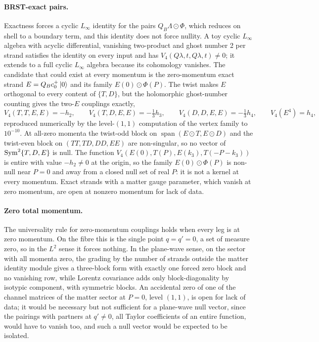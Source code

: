 \paragraph{BRST-exact pairs.}
Exactness forces a cyclic $L_\infty$ identity for the pairs $Q_B \Lambda \odot \Phi$, which reduces on shell to a boundary term, and this identity does not force nullity.
A toy cyclic $L_\infty$ algebra with acyclic differential, vanishing two-product and ghost number 2 per strand satisfies the identity on every input and has $V_4(Q \lambda, t, Q \lambda, t) \ne 0$; it extends to a full cyclic $L_\infty$ algebra because its cohomology vanishes.
The candidate that could exist at every momentum is the zero-momentum exact strand $E = Q_B c_0^+ \ket{0}$ and its family $E(0) \odot \Phi(P)$.
The twist makes $E$ orthogonal to every content of $\{T, D\}$, but the holomorphic ghost-number counting gives the two-$E$ couplings exactly,
\begin{equation}
  \label{eq:mom:two-E}
  V_4(T, T, E, E)
    = - h_2,
  \qquad
  V_4(T, D, E, E)
    = - \tfrac{1}{3} h_3,
  \qquad
  V_4(D, D, E, E)
    = - \tfrac{1}{3} h_4,
  \qquad
  V_4(E^4)
    = h_4,
\end{equation}
reproduced numerically by the level-$(1, 1)$ computation of the vertex family to $10^{-10}$.
At all-zero momenta the twist-odd block on $\operatorname{span}(E \odot T, E \odot D)$ and the twist-even block on $(TT, TD, DD, EE)$ are non-singular, so no vector of $\operatorname{Sym}^2 \{T, D, E\}$ is null.
The function $V_4(E(0), T(P), E(k_3), T(- P - k_3))$ is entire with value $- h_2 \ne 0$ at the origin, so the family $E(0) \odot \Phi(P)$ is non-null near $P = 0$ and away from a closed null set of real $P$: it is not a kernel at every momentum.
Exact strands with a matter gauge parameter, which vanish at zero momentum, are open at nonzero momentum for lack of data.

\paragraph{Zero total momentum.}
The universality rule for zero-momentum couplings holds when every leg is at zero momentum.
On the fibre this is the single point $q = q' = 0$, a set of measure zero, so in the $L^2$ sense it forces nothing.
In the plane-wave sense, on the sector with all momenta zero, the grading by the number of strands outside the matter identity module gives a three-block form with exactly one forced zero block and no vanishing row, while Lorentz covariance adds only block-diagonality by isotypic component, with symmetric blocks.
An accidental zero of one of the channel matrices of the matter sector at $P = 0$, level $(1, 1)$, is open for lack of data; it would be necessary but not sufficient for a plane-wave null vector, since the pairings with partners at $q' \ne 0$, all Taylor coefficients of an entire function, would have to vanish too, and such a null vector would be expected to be isolated.

